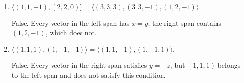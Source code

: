 \begin{enumerate}[label=\alph*)]
\item $\langle(1,1,-1),(2,2,0)\rangle=\langle(3,3,3),(3,3,-1),(1,2,-1)\rangle$.

\begin{answer}
False. Every vector in the left span has $x=y$;
the right span contains $(1,2,-1)$, which does not.
\end{answer}

\item $\langle(1,1,1),(1,-1,-1)\rangle=\langle(1,1,-1),(1,-1,1)\rangle$.

\begin{answer}
False. Every vector in the right span satisfies $y=-z$,
but $(1,1,1)$ belongs to the left span and does not satisfy this condition.
\end{answer}
\end{enumerate}
